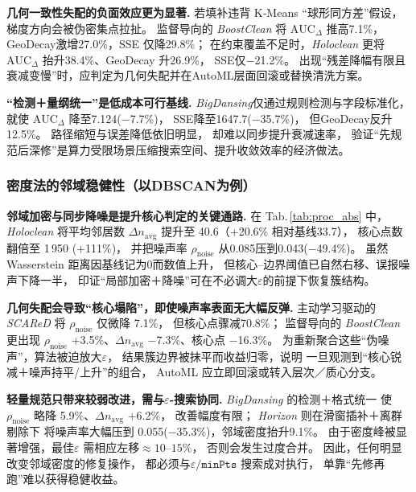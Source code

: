 \documentclass[10pt]{article} %
\numberwithin{equation}{section}
\begin{document}
\medskip
\noindent
\textbf{几何一致性失配的负面效应更为显著.}\;
若填补违背 K‑Means “球形同方差”假设，梯度方向会被伪密集点拉扯。%
监督导向的 \textit{BoostClean} 将 $\mathrm{AUC}_{\Delta}$ 推高7.1\%，
GeoDecay激增27.0\%，SSE 仅降29.8\%；%
在约束覆盖不足时，\textit{Holoclean} 更将
$\mathrm{AUC}_{\Delta}$ 抬升38.4\%、GeoDecay 升26.9\%，
SSE仅−21.2\%。%
出现“残差降幅有限且衰减变慢”时，应判定为几何失配并在AutoML层面回滚或替换清洗方案。

\medskip
\noindent
\textbf{“检测＋量纲统一”是低成本可行基线.}\;
\textit{BigDansing}仅通过规则检测与字段标准化，
就使 $\mathrm{AUC}_{\Delta}$ 降至7.124(−7.7\%)，
SSE降至1647.7(−35.7\%)，%
但GeoDecay反升12.5\%。%
路径缩短与误差降低依旧明显，%
却难以同步提升衰减速率，%
验证“先规范后深修”是算力受限场景压缩搜索空间、提升收敛效率的经济做法。


\subsubsection{密度法的邻域稳健性（以DBSCAN为例）}
\label{subsec:density_dynamics}

\medskip
\noindent
\textbf{邻域加密与同步降噪是提升核心判定的关键通路.}\;
在 Tab.\,\ref{tab:proc_abs} 中，\textit{Holoclean} 将平均邻居数
$\Delta n_{\text{avg}}$ 提升至 40.6（+20.6\% 相对基线33.7），%
核心点数翻倍至 1 950 (+111\%)，%
并把噪声率 $\rho_{\text{noise}}$ 从0.085压到0.043(−49.4\%)。%
虽然 Wasserstein 距离因基线记为0而数值上升，
但核心–边界阈值已自然右移、误报噪声下降一半，%
印证“局部加密＋降噪”可在不必调大$\varepsilon$的前提下恢复簇结构。

\medskip
\noindent
\textbf{几何失配会导致“核心塌陷”，即使噪声率表面无大幅反弹.}\;
主动学习驱动的 \textit{SCAReD} 将 $\rho_{\text{noise}}$ 仅微降 7.1\%，%
但核心点骤减70.8\%；%
监督导向的 \textit{BoostClean} 更出现
$\rho_{\text{noise}}$ +3.5\%、$\Delta n_{\text{avg}}$ −7.3\%、核心点 −16.3\%。%
为重新聚合这些“伪噪声”，算法被迫放大$\varepsilon$，%
结果簇边界被抹平而收益归零，说明
一旦观测到“核心锐减＋噪声持平/上升”的组合，
AutoML 应立即回滚或转入层次／质心分支。

\medskip
\noindent
\textbf{轻量规范只带来较弱改进，需与$\varepsilon$‑搜索协同.}\;
\textit{BigDansing} 的检测＋格式统一
使 $\rho_{\text{noise}}$ 略降 5.9\%、$\Delta n_{\text{avg}}$ +6.2\%，
改善幅度有限；%
\textit{Horizon} 则在滑窗插补＋离群剔除下
将噪声率大幅压到 0.055(−35.3\%)，邻域密度抬升9.1\%。%
由于密度峰被显著增强，最佳$\varepsilon$
需相应左移\(\approx10–15\%\)，
否则会发生过度合并。%
因此，任何明显改变邻域密度的修复操作，
都必须与$\varepsilon/\texttt{minPts}$ 搜索成对执行，
单靠“先修再跑”难以获得稳健收益。
\end{document}
